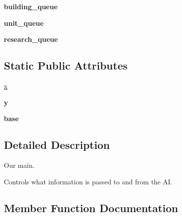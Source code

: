 \begin{DoxyCompactItemize}
\item 
{\bfseries building\+\_\+queue}\hypertarget{classBotty__McBotface_1_1Botty_aa7624e043a553c46f7aa6861b363cd1d}{}\label{classBotty__McBotface_1_1Botty_aa7624e043a553c46f7aa6861b363cd1d}

\item 
{\bfseries unit\+\_\+queue}\hypertarget{classBotty__McBotface_1_1Botty_a6982061129ec75ea45555b35f92979ab}{}\label{classBotty__McBotface_1_1Botty_a6982061129ec75ea45555b35f92979ab}

\item 
{\bfseries research\+\_\+queue}\hypertarget{classBotty__McBotface_1_1Botty_a02e5db2505cb8532ab677cd0300cbf16}{}\label{classBotty__McBotface_1_1Botty_a02e5db2505cb8532ab677cd0300cbf16}

\end{DoxyCompactItemize}
\subsection*{Static Public Attributes}
\begin{DoxyCompactItemize}
\item 
\hyperlink{classBotty__McBotface_1_1Botty_ab149b8002cbcdcce9eee529f42c07d0f}{x}
\item 
{\bfseries y}\hypertarget{classBotty__McBotface_1_1Botty_a1081ab7c3fe8c113ae258db3352e90c4}{}\label{classBotty__McBotface_1_1Botty_a1081ab7c3fe8c113ae258db3352e90c4}

\item 
{\bfseries base}\hypertarget{classBotty__McBotface_1_1Botty_ae6bf573769cd18b1f477b6a8d1c540e2}{}\label{classBotty__McBotface_1_1Botty_ae6bf573769cd18b1f477b6a8d1c540e2}

\end{DoxyCompactItemize}


\subsection{Detailed Description}
Our \textquotesingle{}main\textquotesingle{}. 

Controls what information is passed to and from the AI. 

\subsection{Member Function Documentation}
